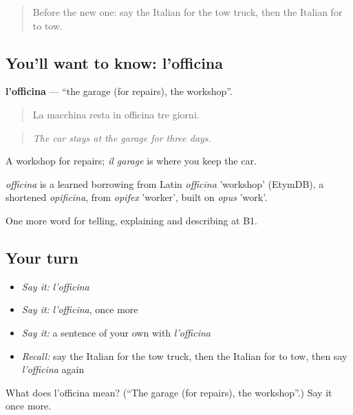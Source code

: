 \label{lesson:IT-C410-officina}



\begin{quote}
Before the new one: say the Italian for the tow truck, then the Italian for to tow.
\end{quote}

\subsection*{You'll want to know: l'officina}
\textbf{l'officina} — \textquotedblleft{}the garage (for repairs), the workshop\textquotedblright{}.

\begin{quote}
La macchina resta in officina tre giorni.
\end{quote}

\begin{quote}
\emph{The car stays at the garage for three days.}
\end{quote}

A workshop for repairs; \emph{il garage} is where you keep the car.

\begin{cousinweb}
\emph{officina} is a learned borrowing from Latin \emph{officīna} 'workshop' (EtymDB), a shortened \emph{opificīna}, from \emph{opifex} 'worker', built on \emph{opus} 'work'.
\end{cousinweb}

\begin{grammarlens}[title={What you've built}]
One more word for telling, explaining and describing at B1.
\end{grammarlens}

\subsection*{Your turn}
\begin{itemize}
\raggedright
  \item \emph{Say it:} \emph{l'officina}
  \item \emph{Say it:} \emph{l'officina}, once more
  \item \emph{Say it:} a sentence of your own with \emph{l'officina}
  \item \emph{Recall:} say the Italian for the tow truck, then the Italian for to tow, then say \emph{l'officina} again
\end{itemize}

\begin{tcolorbox}[breakable,colback=teal!4,colframe=teal!35!black,title={Before you move on}]
What does l'officina mean? (\textquotedblleft{}The garage (for repairs), the workshop\textquotedblright{}.) Say it once more.
\end{tcolorbox}
